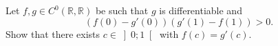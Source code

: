 \begin{problem}
    Let \( f, g \in C^0\left(\mathbb{R},\mathbb{R}\right) \) be such that \( g \) is differentiable and
    \[
        \left(f\left(0\right)-g'\left(0\right)\right)\left(g'\left(1\right)-f\left(1\right)\right) > 0.
    \]
    Show that there exists \( c \in \left]0;1\right[ \) with \( f\left(c\right) = g'\left(c\right) \).
\end{problem}
